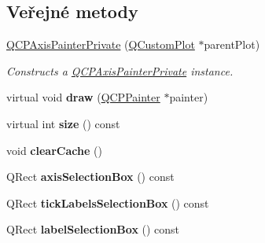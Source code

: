\subsection*{Veřejné metody}
\begin{DoxyCompactItemize}
\item 
\hyperlink{classQCPAxisPainterPrivate_a0f14aa5c4aa83dbcd68984a7c73bf94f}{Q\+C\+P\+Axis\+Painter\+Private} (\hyperlink{classQCustomPlot}{Q\+Custom\+Plot} $\ast$parent\+Plot)
\begin{DoxyCompactList}\small\item\em Constructs a \hyperlink{classQCPAxisPainterPrivate}{Q\+C\+P\+Axis\+Painter\+Private} instance. \end{DoxyCompactList}\item 
\hypertarget{classQCPAxisPainterPrivate_a0207a99bdf9c4f70af20928898ddc2fc}{}virtual void {\bfseries draw} (\hyperlink{classQCPPainter}{Q\+C\+P\+Painter} $\ast$painter)\label{classQCPAxisPainterPrivate_a0207a99bdf9c4f70af20928898ddc2fc}

\item 
\hypertarget{classQCPAxisPainterPrivate_a8b2dc0bd2ccbf6bd450733ec9e410a38}{}virtual int {\bfseries size} () const \label{classQCPAxisPainterPrivate_a8b2dc0bd2ccbf6bd450733ec9e410a38}

\item 
\hypertarget{classQCPAxisPainterPrivate_a7b6806e32c44384fd0ae4dcdaa72b1b5}{}void {\bfseries clear\+Cache} ()\label{classQCPAxisPainterPrivate_a7b6806e32c44384fd0ae4dcdaa72b1b5}

\item 
\hypertarget{classQCPAxisPainterPrivate_aaf93529ac60215ea020cdff5635c3e80}{}Q\+Rect {\bfseries axis\+Selection\+Box} () const \label{classQCPAxisPainterPrivate_aaf93529ac60215ea020cdff5635c3e80}

\item 
\hypertarget{classQCPAxisPainterPrivate_af02fc189ab8460c202eb4138c9aca516}{}Q\+Rect {\bfseries tick\+Labels\+Selection\+Box} () const \label{classQCPAxisPainterPrivate_af02fc189ab8460c202eb4138c9aca516}

\item 
\hypertarget{classQCPAxisPainterPrivate_ae907476bf8cf0ecd17620575e17c06b1}{}Q\+Rect {\bfseries label\+Selection\+Box} () const \label{classQCPAxisPainterPrivate_ae907476bf8cf0ecd17620575e17c06b1}

\end{DoxyCompactItemize}
